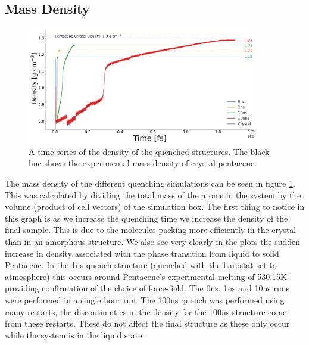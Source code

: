 \subsection{Mass Density}
\begin{figure}[ht]
	\centering
	\includegraphics[width=0.9\textwidth]{../img/DifferentQuenchTimes/Density.png}
	\caption{\label{fig:QuenchDensity}A time series of the density of the quenched structures. The black line shows the experimental mass density of crystal pentacene.}
\end{figure}
\noindent The mass density of the  different quenching simulations can be seen in figure \ref{fig:QuenchDensity}. This was calculated by dividing the total mass of the atoms in the system by the volume (product of cell vectors) of the simulation box. The first thing to notice in this graph is as we increase the quenching time we increase the density of the final sample. This is due to the molecules packing more efficiently in the crystal than in an amorphous structure. We also see very clearly in the plots the sudden increase in density associated with the phase transition from liquid to solid Pentacene. In the 1ns quench structure (quenched with the barostat set to  atmosphere) this occurs around Pentacene's experimental melting of 530.15K \cite{PentaceneMeltingPoint} providing confirmation of the choice of force-field. The 0ns, 1ns and 10ns runs were performed in a single  hour run. The 100ns quench was performed using many restarts, the discontinuities in the density for the 100ns structure come from these restarts. These do not affect the final structure as these only occur while the system is in the liquid state.


